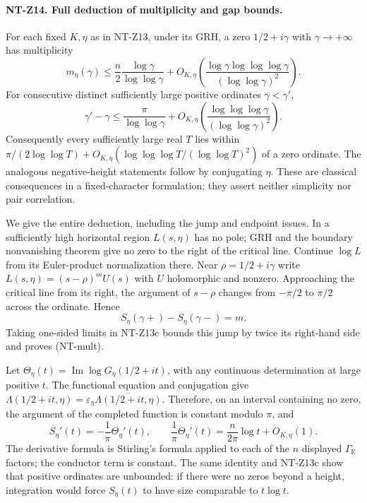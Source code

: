 \documentclass[11pt,a4paper]{article}
\begin{document}
\paragraph{NT-Z14. Full deduction of multiplicity and gap bounds.}
For each fixed $K,\eta$ as in NT-Z13, under its GRH, a zero
$1/2+i\gamma$ with $\gamma\to+\infty$ has multiplicity
\[
 m_\eta(\gamma)\le\frac n2\frac{\log\gamma}{\log\log\gamma}
   +O_{K,\eta}\left(
    \frac{\log\gamma\log\log\log\gamma}{(\log\log\gamma)^2}\right).
\tag{NT-mult}
\]
For consecutive distinct sufficiently large positive ordinates
$\gamma<\gamma'$,
\[
 \gamma'-\gamma\le\frac{\pi}{\log\log\gamma}
   +O_{K,\eta}\left(
    \frac{\log\log\log\gamma}{(\log\log\gamma)^2}\right).
\tag{NT-gap}
\]
Consequently every sufficiently large real $T$ lies within
$\pi/(2\log\log T)+O_{K,\eta}(
\log\log\log T/(\log\log T)^2)$ of a zero ordinate.  The analogous
negative-height statements follow by conjugating $\eta$.  These are
classical consequences in a fixed-character formulation; they assert
neither simplicity nor pair correlation.

We give the entire deduction, including the jump and endpoint issues.
In a sufficiently high horizontal region $L(s,\eta)$ has no pole;
GRH and the boundary nonvanishing theorem give no zero to the right
of the critical line.  Continue $\log L$ from its Euler-product
normalization there.  Near $\rho=1/2+i\gamma$ write
$L(s,\eta)=(s-\rho)^m U(s)$ with $U$ holomorphic and nonzero.
Approaching the critical line from its right, the argument of
$s-\rho$ changes from $-\pi/2$ to $\pi/2$ across the ordinate.
Hence
\[
 S_\eta(\gamma+)-S_\eta(\gamma-)=m.
\]
Taking one-sided limits in NT-Z13c bounds this jump by twice its
right-hand side and proves (NT-mult).

Let $\Theta_\eta(t)=\operatorname{Im}\log G_\eta(1/2+it)$, with
any continuous determination at large positive $t$.
The functional equation and conjugation give
$\Lambda(1/2+it,\eta)=\varepsilon_\eta
\overline{\Lambda(1/2+it,\eta)}$.
Therefore, on an interval containing no zero, the argument of the
completed function is constant modulo $\pi$, and
\[
 S_\eta'(t)=-\frac1\pi\Theta_\eta'(t),\qquad
 \frac1\pi\Theta_\eta'(t)
    =\frac n{2\pi}\log t+O_{K,\eta}(1).
\tag{NT-phase}
\]
The derivative formula is Stirling's formula applied to each of the
$n$ displayed $\Gamma_{\mathbb R}$ factors; the conductor term is
constant.  The same identity and NT-Z13c show that positive ordinates
are unbounded: if there were no zeros beyond a height, integration
would force $S_\eta(t)$ to have size comparable to $t\log t$.
\end{document}
